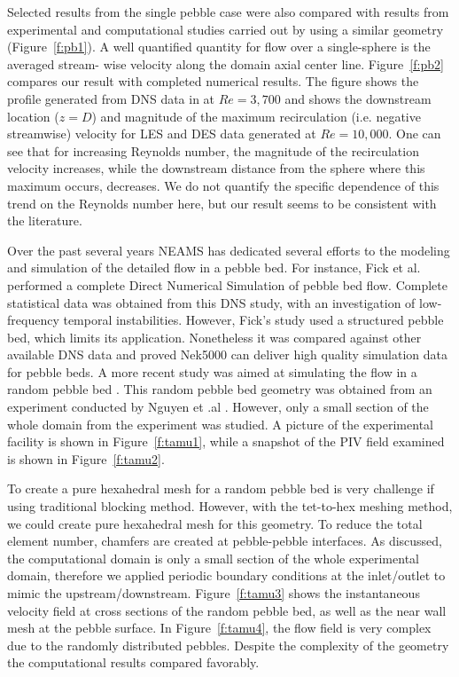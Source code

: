 Selected results from the single pebble case were also compared with results from experimental and computational studies carried out by using a similar geometry (Figure~\ref{f:pb1}). A well quantified quantity for flow over a single-sphere is the averaged stream- wise velocity along the domain axial center line. Figure~\ref{f:pb2} compares our result with completed numerical results. The figure shows the profile generated from DNS data in \cite{fick2017investigation} at $Re = 3,700$ and shows the downstream location ($z=D$) and magnitude of the maximum recirculation (i.e. negative streamwise) velocity for LES and DES data generated at $Re = 10,000$. One can see that for increasing Reynolds number, the magnitude of the recirculation velocity increases, while the downstream distance from the sphere where this maximum occurs, decreases. We do not quantify the specific dependence of this trend on the Reynolds number here, but our result seems to be consistent with the literature.

Over the past several years NEAMS has dedicated several efforts to the modeling and simulation of the detailed flow in a pebble bed. For instance, Fick et al. \cite{fick2017direct}  performed a complete Direct Numerical Simulation of pebble bed flow. Complete statistical data was obtained from this DNS study, with an investigation of low-frequency temporal instabilities. However, Fick's study \cite{fick2017direct} used a structured pebble bed, which limits its application. Nonetheless it was compared against other available DNS data and proved Nek5000 can deliver high quality simulation data for pebble beds. A more recent study was aimed at simulating the flow in a random pebble bed \cite{yildiz2020direct}. This random pebble bed geometry was obtained from an experiment conducted by Nguyen et .al \cite{nguyen2018time}. However, only a small section of the whole domain from the experiment was studied. A picture of the experimental facility is shown in Figure~\ref{f:tamu1}, while a snapshot of the PIV field examined is shown in Figure~\ref{f:tamu2}.

To create a pure hexahedral mesh for a random pebble bed is very challenge if using traditional blocking method. However, with the tet-to-hex meshing method, we could create pure hexahedral mesh for this geometry. To reduce the total element number, chamfers are created at pebble-pebble interfaces. As discussed, the computational domain is only a small section of the whole experimental domain, therefore we applied periodic boundary conditions at the inlet/outlet to mimic the upstream/downstream. Figure~\ref{f:tamu3} shows the instantaneous velocity field at cross sections of the random pebble bed, as well as the near wall mesh at the pebble surface. In Figure~\ref{f:tamu4}, the flow field is very complex due to the randomly distributed pebbles. Despite the complexity of the geometry the computational results compared favorably.

